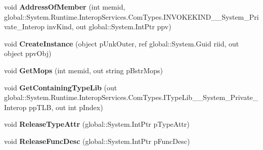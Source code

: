 \begin{DoxyCompactItemize}
void {\bfseries Address\+Of\+Member} (int memid, global\+::\+System.\+Runtime.\+Interop\+Services.\+Com\+Types.\+I\+N\+V\+O\+K\+E\+K\+I\+N\+D\+\_\+\+\_\+\+System\+\_\+\+Private\+\_\+\+Interop inv\+Kind, out global\+::\+System.\+Int\+Ptr ppv)
\item 
\mbox{\label{interface_system_1_1_runtime_1_1_interop_services_1_1_com_types_1_1_i_type_info_____system___private___interop_a3761e8c27250fe83496741af259e32b2}} 
void {\bfseries Create\+Instance} (object p\+Unk\+Outer, ref global\+::\+System.\+Guid riid, out object ppv\+Obj)
\item 
\mbox{\label{interface_system_1_1_runtime_1_1_interop_services_1_1_com_types_1_1_i_type_info_____system___private___interop_ad7930f0f8850b675844658850a360028}} 
void {\bfseries Get\+Mops} (int memid, out string p\+Bstr\+Mops)
\item 
\mbox{\label{interface_system_1_1_runtime_1_1_interop_services_1_1_com_types_1_1_i_type_info_____system___private___interop_acc525f75f6bdf2ae3ff9bd1d132e010e}} 
void {\bfseries Get\+Containing\+Type\+Lib} (out global\+::\+System.\+Runtime.\+Interop\+Services.\+Com\+Types.\+I\+Type\+Lib\+\_\+\+\_\+\+System\+\_\+\+Private\+\_\+\+Interop pp\+T\+LB, out int p\+Index)
\item 
\mbox{\label{interface_system_1_1_runtime_1_1_interop_services_1_1_com_types_1_1_i_type_info_____system___private___interop_a455eccf7a3747e78838d503b18d828a5}} 
void {\bfseries Release\+Type\+Attr} (global\+::\+System.\+Int\+Ptr p\+Type\+Attr)
\item 
\mbox{\label{interface_system_1_1_runtime_1_1_interop_services_1_1_com_types_1_1_i_type_info_____system___private___interop_a979479883b01e365a0b69c48061af1d5}} 
void {\bfseries Release\+Func\+Desc} (global\+::\+System.\+Int\+Ptr p\+Func\+Desc)

\end{DoxyCompactItemize}
